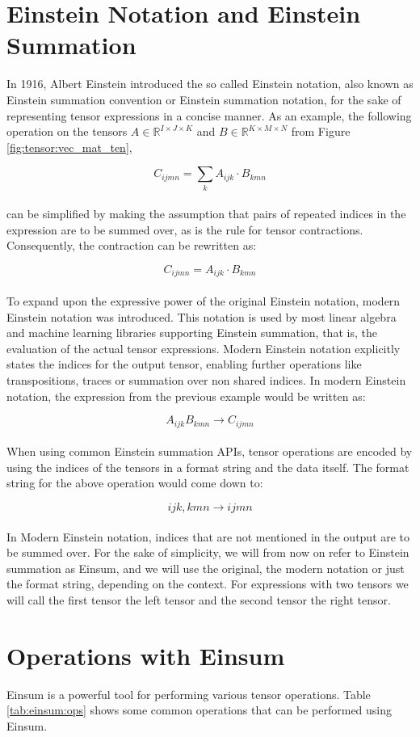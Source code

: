 \section{Einstein Notation and Einstein Summation}
In 1916, Albert Einstein introduced the so called Einstein notation, also known as
Einstein summation convention or Einstein summation notation, for the sake of
representing tensor expressions in a concise manner. As an example, the following
operation on the tensors $A \in \mathbb{R}^{I \times J \times K}$ and
$B \in \mathbb{R}^{K \times M \times N}$ from Figure \ref{fig:tensor:vec_mat_ten},

\[C_{ijmn} = \sum_{k}A_{ijk} \cdot B_{kmn}\]
\noindent
\\
can be simplified by making the assumption that pairs of repeated indices in the expression
are to be summed over, as is the rule for tensor contractions. Consequently, the contraction
can be rewritten as:

\[C_{ijmn} = A_{ijk} \cdot B_{kmn}\]
\noindent
\\
To expand upon the expressive power of the original Einstein notation, modern Einstein
notation was introduced. This notation is used by most linear algebra and machine
learning libraries supporting Einstein summation, that is, the evaluation of the actual
tensor expressions. Modern Einstein notation explicitly states the indices for the
output tensor, enabling further operations like transpositions, traces or summation
over non shared indices. In modern Einstein notation, the expression from the previous
example would be written as:

\[A_{ijk}B_{kmn} \rightarrow C_{ijmn}\]
\noindent
\\
When using common Einstein summation APIs, tensor operations are encoded by using the
indices of the tensors in a format string and the data itself. The format string for 
the above operation would come down to:

\[ijk,kmn \rightarrow ijmn\]
\noindent
\\
In Modern Einstein notation, indices that are not mentioned in the output are to be
summed over. For the sake of simplicity, we will from now on refer to Einstein summation
as Einsum, and we will use the original, the modern notation or just the format
string, depending on the context. For expressions with two tensors we will call the first
tensor the left tensor and the second tensor the right tensor.

\section{Operations with Einsum}
Einsum is a powerful tool for performing various tensor operations. Table \ref{tab:einsum:ops}
shows some common operations that can be performed using Einsum.


